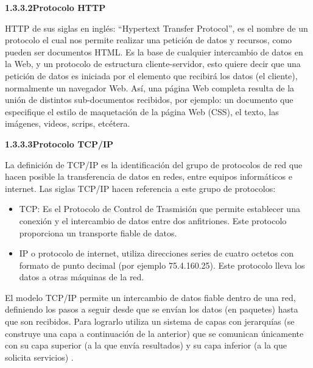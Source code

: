         \textbf{1.3.3.2\hspace{5mm}Protocolo HTTP}

    HTTP de sus siglas en inglés: “Hypertext Transfer Protocol”, es el nombre de un protocolo el cual nos permite realizar una petición de datos y recursos, como pueden ser documentos HTML. Es la base de cualquier intercambio de datos en la Web, y un protocolo de estructura cliente-servidor, esto quiere decir que una petición de datos es iniciada por el elemento que recibirá los datos (el cliente), normalmente un navegador Web. Así, una página Web completa resulta de la unión de distintos sub-documentos recibidos, por ejemplo: un documento que especifique el estilo de maquetación de la página Web (CSS), el texto, las imágenes, videos, scrips, etcétera.\\


        \textbf{1.3.3.3\hspace{5mm}Protocolo TCP/IP}

    La definición de TCP/IP es la identificación del grupo de protocolos de red que hacen posible la transferencia de datos en redes, entre equipos informáticos e internet. Las siglas TCP/IP hacen referencia a este grupo de protocolos:

    \begin{itemize}
        \item TCP: Es el Protocolo de Control de Trasmisión que permite establecer una conexión y el intercambio de datos entre dos anfitriones. Este protocolo proporciona un transporte fiable de datos.
        \item IP o protocolo de internet, utiliza direcciones series de cuatro octetos con formato de punto decimal (por ejemplo 75.4.160.25). Este protocolo lleva los datos a otras máquinas de la red.
    \end{itemize}

    El modelo TCP/IP permite un intercambio de datos fiable dentro de una red, definiendo los pasos a seguir desde que se envían los datos (en paquetes) hasta que son recibidos. Para lograrlo utiliza un sistema de capas con jerarquías (se construye una capa a continuación de la anterior) que se comunican únicamente con su capa superior (a la que envía resultados) y su capa inferior (a la que solicita servicios) \cite{tcp/ip}.

